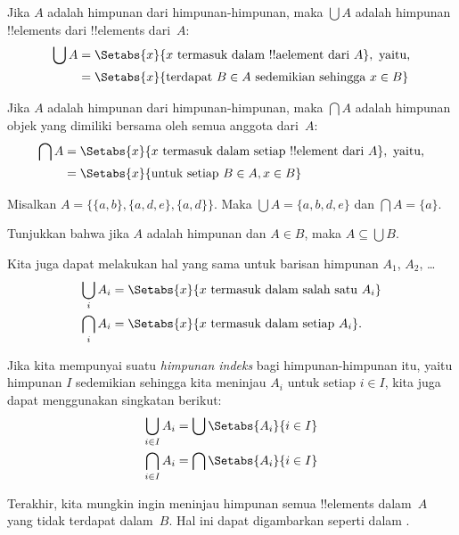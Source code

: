 \documentclass[../../../include/open-logic-section]{subfiles}
\begin{document}
\begin{defn}
Jika $A$ adalah himpunan dari himpunan-himpunan, maka $\bigcup A$
adalah himpunan !!{element}s dari !!{element}s dari~$A$:
\begin{align*}
\bigcup A & = \Setabs{x}{x \text{ termasuk dalam !!a{element} dari } A},
\text{ yaitu,}\\
& = \Setabs{x}{\text{terdapat } B \in A
  \text{ sedemikian sehingga } x \in B}
\end{align*}
\end{defn}

\begin{defn}
Jika $A$ adalah himpunan dari himpunan-himpunan, maka $\bigcap A$
adalah himpunan objek yang dimiliki bersama oleh semua anggota
dari~$A$:
\begin{align*}
\bigcap A & = \Setabs{x}{x \text{ termasuk dalam setiap !!{element} dari } A},
\text{ yaitu,}\\
 & = \Setabs{x}{\text{untuk setiap } B \in A, x \in B}
\end{align*}
\end{defn}

\begin{ex}
Misalkan $A = \{ \{ a, b \}, \{ a, d, e \}, \{ a, d \} \}$.
Maka $\bigcup A = \{ a, b, d, e \}$ dan $\bigcap A = \{ a \}$.
\end{ex}
\begin{prob}
	Tunjukkan bahwa jika $A$ adalah himpunan dan $A \in B$, maka
	$A \subseteq \bigcup B$.
\end{prob}

Kita juga dapat melakukan hal yang sama untuk barisan himpunan $A_1$,
$A_2$, \dots
\begin{align*}
\bigcup_i A_i & = \Setabs{x}{x \text{ termasuk dalam salah satu } A_i}\\
\bigcap_i A_i & = \Setabs{x}{x \text{ termasuk dalam setiap } A_i}.
\end{align*}

Jika kita mempunyai suatu \emph{himpunan indeks} bagi himpunan-himpunan
itu, yaitu himpunan $I$ sedemikian sehingga kita meninjau $A_i$ untuk
setiap $i \in I$, kita juga dapat menggunakan singkatan berikut:
\begin{align*}
	\bigcup_{i \in I} A_i & = \bigcup \Setabs{A_i }{i \in I}\\
	\bigcap_{i \in I} A_i & = \bigcap\Setabs{A_i}{i \in I}
\end{align*}

Terakhir, kita mungkin ingin meninjau himpunan semua !!{element}s
dalam~$A$ yang tidak terdapat dalam~$B$. Hal ini dapat digambarkan
seperti dalam .
\end{document}
